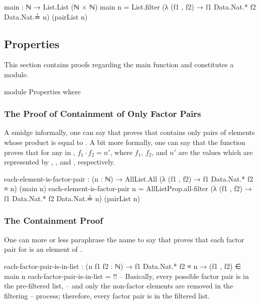 \documentclass{report}
\begin{document}
\begin{code}
  main : ℕ → List.List (ℕ × ℕ)
  main n = List.filter (λ (f1 , f2) → f1 Data.Nat.* f2 Data.Nat.≟ n)
                       (pairList n)
\end{code}

\subsection{Properties}
This section contains proofs regarding the main function and constitutes a module.

\begin{code}
  module Properties where
\end{code}

\subsubsection{The Proof of Containment of Only Factor Pairs}
A smidge informally, one can say that  proves that   contains only pairs of elements whose product is equal to .  A bit more formally, one can say that the function proves that for any  \AgdaOperator{\AgdaInductiveConstructor{,}}  in  , \(f_1 \cdot f_2 = n\prime\), where \(f_1\), \(f_2\), and \(n\prime\) are the values which are represented by , , and , respectively.

\begin{code}
    each-element-is-factor-pair :
      (n : ℕ) →
      AllList.All (λ (f1 , f2) → f1 Data.Nat.* f2 ≡ n) (main n)
    each-element-is-factor-pair n =
      AllListProp.all-filter
        (λ (f1 , f2) → f1 Data.Nat.* f2 Data.Nat.≟ n)
        (pairList n)
\end{code}

\subsubsection{The Containment Proof}
One can more or less paraphrase the name to say that  proves that each factor pair for  is an element of  .

\begin{code}
    each-factor-pair-is-in-list :
      (n f1 f2 : ℕ) →
      f1 Data.Nat.* f2 ≡ n →
      (f1 , f2) ∈ main n
    each-factor-pair-is-in-list = {!!}
    -- Basically, every possible factor pair is in the pre-filtered list,
    -- and only the non-factor elements are removed in the filtering
    -- process; therefore, every factor pair is in the filtered list.
\end{code}
\end{document}
